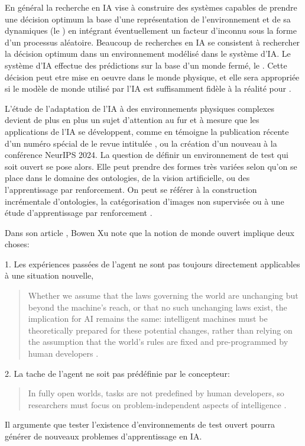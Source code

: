 En général la recherche en IA vise à construire des systèmes capables de prendre une décision optimum la base d'une représentation de l'environnement et de sa dynamiques (le ) en intégrant éventuellement un facteur d'inconnu sous la forme d'un processus aléatoire. 
Beaucoup de recherches en IA se consistent à rechercher la décision optimum dans un environnement modélisé dans le système d'IA. 
Le système d'IA effectue des prédictions sur la base d'un monde fermé, le .
Cette décision peut etre mise en oeuvre dans le monde physique, et elle sera appropriée si le modèle de monde utilisé par l'IA est suffisamment fidèle à la réalité pour .  

L'étude de l'adaptation de l'IA à des environnements physiques complexes devient de plus en plus un sujet d'attention au fur et à mesure que les applications de l'IA se développent, comme en témoigne la publication récente d'un numéro spécial de le revue   intitulée  \cite{holder_introduction_2025}, ou la création d'un nouveau  à la conférence NeurIPS 2024. 
La question de définir un environnement de test qui soit ouvert se pose alors. 
Elle peut prendre des formes très variées selon qu'on se place dans le domaine des ontologies, de la vision artificielle, ou des l'apprentissage par renforcement. 
On peut se référer à la construction incrémentale d'ontologies, la catégorisation d'images non supervisée \cite{jafarzadeh_review_2022} ou à une étude d'apprentissage par renforcement  \cite{team_open-ended_2021}. 


Dans son article , Bowen Xu note que la notion de monde ouvert implique deux choses: 

1. Les expériences passées de l'agent ne sont pas toujours directement applicables à une situation nouvelle, 
\begin{quote}
	Whether we assume that the laws governing the world are unchanging but beyond the machine’s reach, or that no such unchanging laws exist, the implication for AI remains the same: intelligent machines must be theoretically prepared for these potential changes, rather than relying on the assumption that the world’s rules are fixed and pre-programmed by human developers \cite[p.~3]{xu_what_2024}.
\end{quote}

2. La tache de l'agent ne soit pas prédéfinie par le concepteur:  
\begin{quote}
	In fully open worlds, tasks are not predefined by human developers, so researchers must focus on problem-independent aspects of intelligence 
	\cite[p.~3]{xu_what_2024}.
\end{quote}
Il argumente que tester l'existence d'environnements de test ouvert pourra générer de nouveaux problemes d'apprentissage en IA. 


